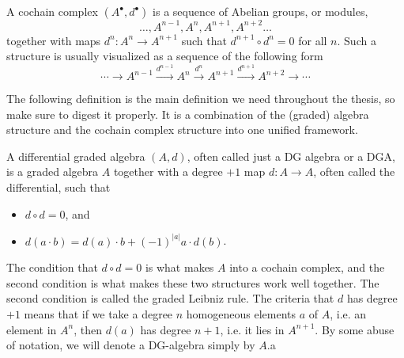 \begin{definition}
A cochain complex $(A^{\bullet}, d^{\bullet})$ is a sequence of Abelian groups, or modules,
\begin{equation*}
    \ldots, A^{n-1}, A^n, A^{n+1}, A^{n+2}\ldots
\end{equation*}
together with maps $d^n:A^n\rightarrow A^{n+1}$ such that $d^{n+1}\circ d^n = 0$ for all $n$. Such a structure is usually visualized as a sequence of the following form
\begin{equation*}
    \cdots\longrightarrow A^{n-1} \overset{d^{n-1}}\longrightarrow A^n \overset{d^n}\longrightarrow A^{n+1} \overset{d^{n+1}}\longrightarrow A^{n+2}\longrightarrow\cdots
\end{equation*}
\end{definition}

The following definition is the main definition we need throughout the thesis, so make sure to digest it properly. It is a combination of the (graded) algebra structure and the cochain complex structure into one unified framework. 

\begin{definition}
A differential graded algebra $(A, d)$, often called just a DG algebra or a DGA, is a graded algebra $A$ together with a degree $+1$ map $d: A\rightarrow A$, often called the differential, such that 
\begin{itemize}
    \item $d\circ d = 0$, and
    \item $d(a\cdot b) = d(a)\cdot b + (-1)^{|a|}a\cdot d(b)$. 
\end{itemize}
\end{definition}

The condition that $d\circ d = 0$ is what makes $A$ into a cochain complex, and the second condition is what makes these two structures work well together. The second condition is called the graded Leibniz rule. The criteria that $d$ has degree $+1$ means that if we take a degree $n$ homogeneous elements $a$ of $A$, i.e. an element in $A^n$, then $d(a)$ has degree $n+1$, i.e. it lies in $A^{n+1}$. By some abuse of notation, we will denote a DG-algebra simply by $A$.a

